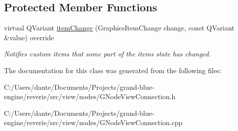 \subsection*{Protected Member Functions}
\begin{DoxyCompactItemize}
\item 
\mbox{\label{classrev_1_1_view_1_1_node_view_connection_split_a90ec65c56c3891e6393ed52def2f0c13}} 
virtual Q\+Variant \mbox{\hyperlink{classrev_1_1_view_1_1_node_view_connection_split_a90ec65c56c3891e6393ed52def2f0c13}{item\+Change}} (Graphics\+Item\+Change change, const Q\+Variant \&value) override
\begin{DoxyCompactList}\small\item\em Notifies custom items that some part of the item\textquotesingle{}s state has changed. \end{DoxyCompactList}\end{DoxyCompactItemize}


The documentation for this class was generated from the following files\+:\begin{DoxyCompactItemize}
\item 
C\+:/\+Users/dante/\+Documents/\+Projects/grand-\/blue-\/engine/reverie/src/view/nodes/G\+Node\+View\+Connection.\+h\item 
C\+:/\+Users/dante/\+Documents/\+Projects/grand-\/blue-\/engine/reverie/src/view/nodes/G\+Node\+View\+Connection.\+cpp\end{DoxyCompactItemize}
